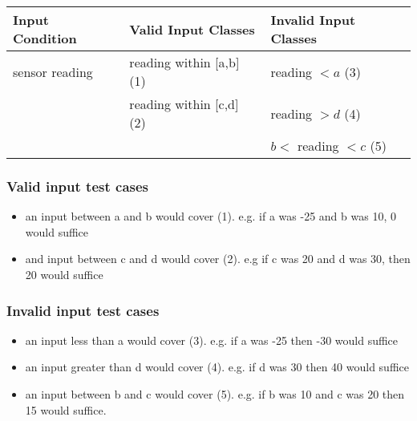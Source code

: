 \documentclass[letterpaper]{article}
\begin{document}
\begin{adjustbox}{center}
	\begin{tabularx}{1.2\textwidth}{X|X|X|}
		Input Condition & Valid Input Classes      & Invalid Input Classes    \\ \hline
		sensor reading  & reading within [a,b] (1) & reading $<a$ (3)         \\
				& reading within [c,d] (2) & reading $>d$ (4)         \\
				&                          & $b <$ reading $< c$ (5)  \\ \hline
	\end{tabularx}
\end{adjustbox}

\subsubsection*{Valid input test cases}
\begin{itemize}
	\item an input between a and b would cover (1). e.g. if a was -25 and b
		was 10, 0 would suffice
	\item and input between c and d would cover (2). e.g if c was 20 and d
		was 30, then 20 would suffice
\end{itemize}

\subsubsection*{Invalid input test cases}
\begin{itemize}
	\item an input less than a would cover (3). e.g. if a was -25 then -30
		would suffice
	\item an input greater than d would cover (4). e.g. if d was 30 then 40
		would suffice
	\item an input between b and c would cover (5). e.g. if b was 10 and c
		was 20 then 15 would suffice.
\end{itemize}
\end{document}
